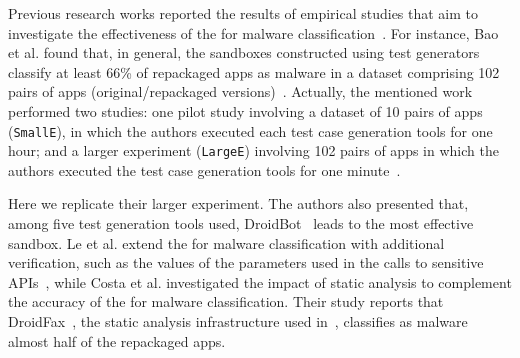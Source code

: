






Previous research works reported the results of empirical studies that aim to investigate the effectiveness of
the \mas for malware classification~\cite{DBLP:conf/wcre/BaoLL18,DBLP:conf/scam/CostaMCMVBC20}.
For instance, Bao et al. found that, in general, the sandboxes constructed using test generators classify at least 66\% of repackaged apps as malware in a
dataset comprising 102 pairs of apps (original/repackaged versions)~\cite{DBLP:conf/wcre/BaoLL18}.
Actually, the mentioned work performed two studies: one pilot study involving a dataset
of 10 pairs of apps (\texttt{SmallE}), in which the authors executed each test case generation tools for one hour; and a larger experiment
(\texttt{LargeE}) involving 102 pairs of
apps in which the authors executed the test case generation tools for one minute~\cite{DBLP:conf/wcre/BaoLL18}.

Here we replicate their larger experiment. 
The authors also presented that, among five test generation tools used, DroidBot~\cite{DBLP:conf/icse/LiYGC17} leads to the most effective sandbox.
Le et al. extend the \mas for malware classification with additional verification,
such as the values of the parameters used in the
calls to sensitive APIs~\cite{le2018towards}, while
Costa et al.\cite{DBLP:journals/jss/CostaMMSSBNR22} investigated the impact of static analysis to complement the accuracy of the \mas
for malware classification. Their study reports that DroidFax~\cite{DBLP:conf/icsm/CaiR17a}, the static analysis infrastructure used in~\cite{DBLP:conf/wcre/BaoLL18}, classifies as malware almost half of the repackaged apps.

